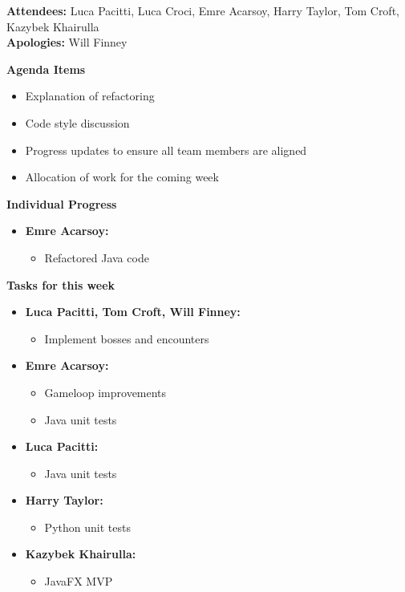 \documentclass[11pt]{article}
\begin{document}
    \textbf{Attendees:} Luca Pacitti, Luca Croci, Emre Acarsoy, Harry Taylor, Tom Croft, Kazybek Khairulla \\
    \textbf{Apologies:} Will Finney

    \textbf{Agenda Items}
    \begin{itemize}
        \item Explanation of refactoring
        \item Code style discussion
        \item Progress updates to ensure all team members are aligned
        \item Allocation of work for the coming week
    \end{itemize}

    \textbf{Individual Progress}
    \begin{itemize}
        \item \textbf{Emre Acarsoy:}
        \begin{itemize}
            \item Refactored Java code
        \end{itemize}
    \end{itemize}

    \textbf{Tasks for this week}
    \begin{itemize}
        \item \textbf{Luca Pacitti, Tom Croft, Will Finney:}
        \begin{itemize}
            \item Implement bosses and encounters
        \end{itemize}

        \item \textbf{Emre Acarsoy:}
        \begin{itemize}
            \item Gameloop improvements
            \item Java unit tests
        \end{itemize}

        \item \textbf{Luca Pacitti:}
        \begin{itemize}
            \item Java unit tests
        \end{itemize}

        \item \textbf{Harry Taylor:}
        \begin{itemize}
            \item Python unit tests
        \end{itemize}

        \item \textbf{Kazybek Khairulla:}
        \begin{itemize}
            \item JavaFX MVP
        \end{itemize}
    \end{itemize}
\end{document}

